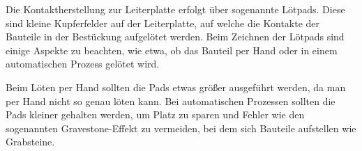 Die Kontaktherstellung zur Leiterplatte erfolgt über sogenannte Lötpads.
Diese sind kleine Kupferfelder auf der Leiterplatte, auf welche die Kontakte der Bauteile in der Bestückung aufgelötet werden. Beim Zeichnen der Lötpads sind einige Aspekte zu beachten, wie etwa, ob das Bauteil per Hand oder in einem automatischen Prozess gelötet wird. 

Beim Löten per Hand sollten die Pads etwas größer ausgeführt werden, da man per Hand nicht so genau löten kann.
Bei automatischen Prozessen sollten die Pads kleiner gehalten werden, um Platz zu sparen und Fehler wie den sogenannten Gravestone-Effekt zu vermeiden, bei dem sich Bauteile aufstellen wie Grabsteine. 
